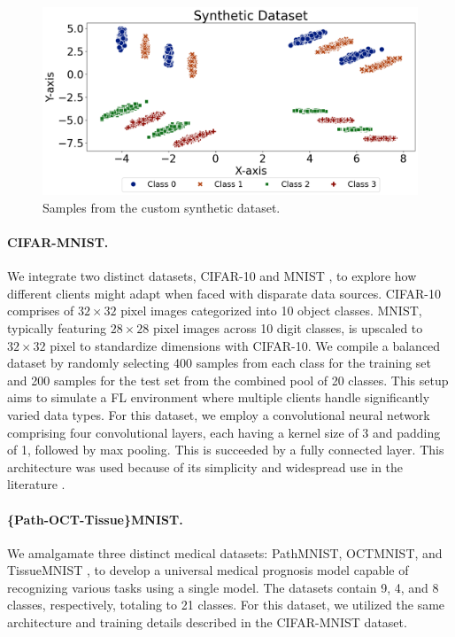 \documentclass{article}
\begin{document}
\begin{figure}
    \centering
    \includegraphics[width=\linewidth]{images/synthetic-data.pdf} 
    \caption{Samples from the custom synthetic dataset.}
    \label{fig:synthetic-data}
\end{figure}

\paragraph{CIFAR-MNIST.} We integrate two distinct datasets, CIFAR-10 \citep{krizhevsky2009learning} and MNIST \citep{lecun1998mnist}, to explore how different clients might adapt when faced with disparate data sources. CIFAR-10 comprises of $32 \times 32$ pixel images categorized into 10 object classes. MNIST, typically featuring $28 \times 28$ pixel images across 10 digit classes, is upscaled to $32 \times 32$ pixel to standardize dimensions with CIFAR-10. We compile a balanced dataset by randomly selecting 400 samples from each class for the training set and 200 samples for the test set from the combined pool of 20 classes. This setup aims to simulate a FL environment where multiple clients handle significantly varied data types. For this dataset, we employ a convolutional neural network comprising four convolutional layers, each having a kernel size of 3 and padding of 1, followed by max pooling. This is succeeded by a fully connected layer. This architecture was used because of its simplicity and widespread use in the literature \citep{yuan2022distributed, isik2022sparse}. 

\paragraph{\{Path-OCT-Tissue\}MNIST.} We amalgamate three distinct medical datasets: PathMNIST, OCTMNIST, and TissueMNIST \citep{medmnistv2}, to develop a universal medical prognosis model capable of recognizing various tasks using a single model. The datasets contain 9, 4, and 8 classes, respectively, totaling to 21 classes. For this dataset, we utilized the same architecture and training details described in the CIFAR-MNIST dataset. 
\end{document}

